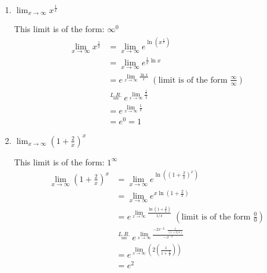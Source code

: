 \documentclass[nooutcomes]{ximera}
\begin{document}
\begin{problem}
\begin{enumerate}
    
    
  \item  $\lim_{x \to \infty} x^{\frac{1}{x}} $
    \begin{freeResponse}
    This limit is of the form: $\infty^0$
      \begin{align*}
        \lim_{x \to \infty} x^{\frac{1}{x}} &= \lim_{x \to \infty} e^{\ln \left( x^{\frac{1}{x}} \right) } \\
                                            &= \lim_{x \to \infty} e^{\frac{1}{x} \ln x } \\
                                            &= e^{ \lim_{x \to \infty} \frac{\ln x}{x} } \; \left( \text{limit is of the form } \frac{\infty}{\infty} \right) \\
                                            &\stackrel{L.R.}{=} e^{\lim_{x \to \infty}\frac{\frac{1}{x}}{1}} \\
                                            &= e^{\lim_{x \to \infty} \frac{1}{x}} \\
                                            &= e^0 = 1
      \end{align*}
    \end{freeResponse}
    
    \item $\lim_{x \to \infty} \left(1+\frac{2}{x}\right)^x$
        \begin{freeResponse}
    This limit is of the form: $1^\infty$
     \begin{align*}
        \lim_{x \to \infty} \left(1+\frac{2}{x}\right)^x &= \lim_{x \to \infty} e^{\ln \left(\left(1+\frac{2}{x}\right)^x \right) } \\
                                            &= \lim_{x \to \infty} e^{x \ln \left(1+\frac{2}{x}\right) } \\
                                            &= e^{ \lim_{x \to \infty} \frac{\ln \left(1+\frac{2}{x}\right)}{1/x} } \; \left( \text{limit is of the form } \frac{0}{0} \right) \\
                                            &\stackrel{L.R.}{=} e^{\lim_{x \to \infty}\frac{-2x^{-2}\cdot \frac{1}{(1+2/x)}}{-x^{-2}}} \\
                                            &= e^{\lim_{x \to \infty} \left(2\left(\frac{1}{1+\frac{2}{x}}\right)\right)} \\
                                            &= e^2 
        \end{align*}
    \end{freeResponse}
    

\end{enumerate}
\end{problem}
\end{document}
